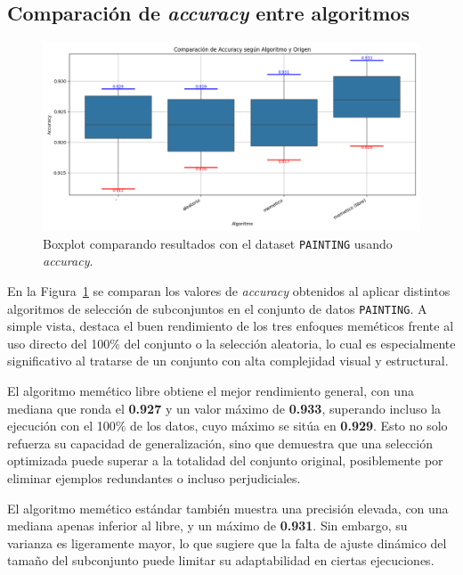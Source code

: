 \subsection{Comparación de \textit{accuracy} entre algoritmos}
\begin{figure}[H]
    \centering
    \includegraphics[width=1\textwidth]{imagenes/evaluaciones/painting/comparacion-por-algoritmo}
    \caption{Boxplot comparando resultados con el dataset \texttt{PAINTING} usando \textit{accuracy}.}
    \label{fig:comparacion-por-algoritmo}
\end{figure}

En la Figura~\ref{fig:comparacion-por-algoritmo} se comparan los valores de \textit{accuracy} obtenidos al aplicar distintos
algoritmos de selección de subconjuntos en el conjunto de datos \texttt{PAINTING}.
A simple vista, destaca el buen rendimiento de los tres enfoques meméticos frente al uso directo del 100\% del conjunto o la selección aleatoria,
lo cual es especialmente significativo al tratarse de un conjunto con alta complejidad visual y estructural.

El algoritmo memético libre obtiene el mejor rendimiento general, con una mediana que ronda el \textbf{0.927} y un valor máximo de \textbf{0.933},
superando incluso la ejecución con el 100\% de los datos, cuyo máximo se sitúa en \textbf{0.929}.
Esto no solo refuerza su capacidad de generalización, sino que demuestra que una selección optimizada puede superar a la totalidad del conjunto original,
posiblemente por eliminar ejemplos redundantes o incluso perjudiciales.

El algoritmo memético estándar también muestra una precisión elevada, con una mediana apenas inferior al libre, y un máximo de \textbf{0.931}.
Sin embargo, su varianza es ligeramente mayor, lo que sugiere que la falta de ajuste dinámico del tamaño del subconjunto puede limitar su adaptabilidad en ciertas ejecuciones.

